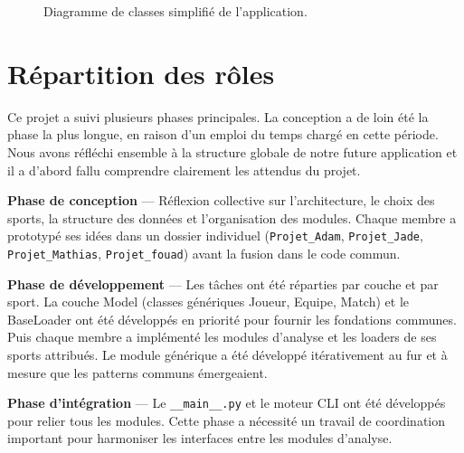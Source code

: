 \documentclass[12pt,a4paper]{article}
\newcommand{\fichier}[1]{\texttt{#1}}
\begin{document}
\begin{figure}[h!]
\caption{Diagramme de classes simplifié de l'application.}
\label{fig:classes}
\end{figure}

\section{Répartition des rôles}
\label{sec:roles}

Ce projet a suivi plusieurs phases principales. La conception a de loin été la phase la
plus longue, en raison d'un emploi du temps chargé en cette période. Nous avons réfléchi
ensemble à la structure globale de notre future application et il a d'abord fallu comprendre
clairement les attendus du projet.

\textbf{Phase de conception} --- Réflexion collective sur l'architecture, le choix des
sports, la structure des données et l'organisation des modules. Chaque membre a
prototypé ses idées dans un dossier individuel (\fichier{Projet\_Adam},
\fichier{Projet\_Jade}, \fichier{Projet\_Mathias}, \fichier{Projet\_fouad}) avant la fusion
dans le code commun.

\textbf{Phase de développement} --- Les tâches ont été réparties par couche et par sport.
La couche Model (classes génériques Joueur, Equipe, Match) et le BaseLoader ont été
développés en priorité pour fournir les fondations communes. Puis chaque membre a
implémenté les modules d'analyse et les loaders de ses sports attribués. Le module
générique a été développé itérativement au fur et à mesure que les patterns communs
émergeaient.

\textbf{Phase d'intégration} --- Le \fichier{\_\_main\_\_.py} et le moteur CLI ont été
développés pour relier tous les modules. Cette phase a nécessité un travail de
coordination important pour harmoniser les interfaces entre les modules d'analyse.
\end{document}
